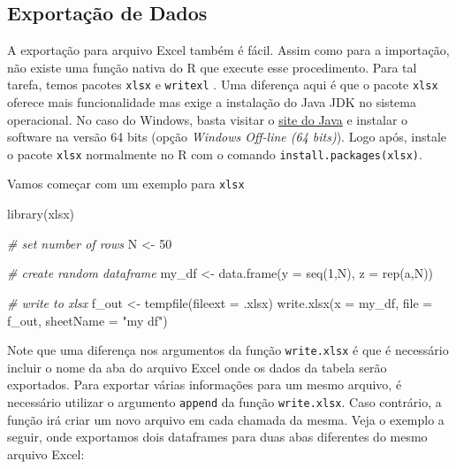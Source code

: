 \documentclass[
  11pt,
]{book}
\newenvironment{Shaded}{\begin{snugshade}}{\end{snugshade}}
\newcommand{\AttributeTok}[1]{\textcolor[rgb]{0.61,0.61,0.61}{#1}}
\newcommand{\CommentTok}[1]{\textcolor[rgb]{0.37,0.37,0.37}{\textit{#1}}}
\newcommand{\DecValTok}[1]{\textcolor[rgb]{0.06,0.06,0.06}{#1}}
\newcommand{\FunctionTok}[1]{\textcolor[rgb]{0,0,0}{#1}}
\newcommand{\NormalTok}[1]{#1}
\newcommand{\OtherTok}[1]{\textcolor[rgb]{0.37,0.37,0.37}{#1}}
\newcommand{\StringTok}[1]{\textcolor[rgb]{0.5,0.5,0.5}{#1}}
\begin{document}
\hypertarget{exportauxe7uxe3o-de-dados-1}{%
\subsection{Exportação de Dados}\label{exportauxe7uxe3o-de-dados-1}}

A exportação para arquivo Excel também é fácil. Assim como para a importação, não existe uma função nativa do R que execute esse procedimento. Para tal tarefa, temos pacotes \texttt{xlsx} e \texttt{writexl} \citep{R-writexl}. Uma diferença aqui é que o pacote \texttt{xlsx} oferece mais funcionalidade mas exige a instalação do Java JDK no sistema operacional. No caso do Windows, basta visitar o \href{https://www.java.com/pt_BR/}{site do Java} e instalar o software na versão 64 bits (opção \emph{Windows Off-line (64 bits)}). Logo após, instale o pacote \texttt{xlsx} normalmente no R com o comando \texttt{install.packages(\textquotesingle{}xlsx\textquotesingle{})}. 

Vamos começar com um exemplo para \texttt{xlsx}

\begin{Shaded}
\begin{Highlighting}[]
\FunctionTok{library}\NormalTok{(xlsx)}

\CommentTok{\# set number of rows}
\NormalTok{N }\OtherTok{\textless{}{-}} \DecValTok{50}

\CommentTok{\# create random dataframe}
\NormalTok{my\_df }\OtherTok{\textless{}{-}} \FunctionTok{data.frame}\NormalTok{(}\AttributeTok{y =} \FunctionTok{seq}\NormalTok{(}\DecValTok{1}\NormalTok{,N),}
                    \AttributeTok{z =} \FunctionTok{rep}\NormalTok{(}\StringTok{\textquotesingle{}a\textquotesingle{}}\NormalTok{,N))}

\CommentTok{\# write to xlsx}
\NormalTok{f\_out }\OtherTok{\textless{}{-}} \FunctionTok{tempfile}\NormalTok{(}\AttributeTok{fileext =} \StringTok{\textquotesingle{}.xlsx\textquotesingle{}}\NormalTok{)}
\FunctionTok{write.xlsx}\NormalTok{(}\AttributeTok{x =}\NormalTok{ my\_df,}
           \AttributeTok{file =}\NormalTok{ f\_out,}
           \AttributeTok{sheetName =} \StringTok{"my df"}\NormalTok{)}
\end{Highlighting}
\end{Shaded}


Note que uma diferença nos argumentos da função \texttt{write.xlsx} é que é necessário incluir o nome da aba do arquivo Excel onde os dados da tabela serão exportados. Para exportar várias informações para um mesmo arquivo, é necessário utilizar o argumento \texttt{append} da função \texttt{write.xlsx}. Caso contrário, a função irá criar um novo arquivo em cada chamada da mesma. Veja o exemplo a seguir, onde exportamos dois dataframes para duas abas diferentes do mesmo arquivo Excel:
\end{document}
